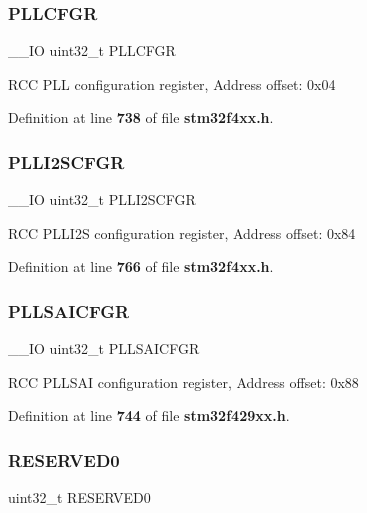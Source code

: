 \subsubsection{P\+L\+L\+C\+F\+GR}
{\footnotesize\ttfamily \+\_\+\+\_\+\+IO uint32\+\_\+t P\+L\+L\+C\+F\+GR}

R\+CC P\+LL configuration register, Address offset\+: 0x04 

Definition at line \textbf{ 738} of file \textbf{ stm32f4xx.\+h}.

\mbox{\label{structRCC__TypeDef_a2d08d5f995ed77228eb56741184a1bb6}} 
\subsubsection{P\+L\+L\+I2\+S\+C\+F\+GR}
{\footnotesize\ttfamily \+\_\+\+\_\+\+IO uint32\+\_\+t P\+L\+L\+I2\+S\+C\+F\+GR}

R\+CC P\+L\+L\+I2S configuration register, Address offset\+: 0x84 

Definition at line \textbf{ 766} of file \textbf{ stm32f4xx.\+h}.

\mbox{\label{structRCC__TypeDef_ac93962b2d41007abdda922a3f23d7ede}} 
\subsubsection{P\+L\+L\+S\+A\+I\+C\+F\+GR}
{\footnotesize\ttfamily \+\_\+\+\_\+\+IO uint32\+\_\+t P\+L\+L\+S\+A\+I\+C\+F\+GR}

R\+CC P\+L\+L\+S\+AI configuration register, Address offset\+: 0x88 

Definition at line \textbf{ 744} of file \textbf{ stm32f429xx.\+h}.

\mbox{\label{structRCC__TypeDef_af86c61a5d38a4fc9cef942a12744486b}} 
\subsubsection{R\+E\+S\+E\+R\+V\+E\+D0}
{\footnotesize\ttfamily uint32\+\_\+t R\+E\+S\+E\+R\+V\+E\+D0}

